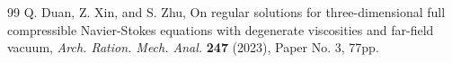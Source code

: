 \documentclass[10pt,a4paper]{amsart}
\begin{document}
\begin{thebibliography}{99}
 Q. Duan, Z. Xin, and S. Zhu, On regular solutions for three-dimensional full compressible Navier-Stokes equations with degenerate viscosities and far-field vacuum, \textit{Arch. Ration. Mech. Anal.} \textbf{247} (2023), Paper No. 3, 77pp.
\end{thebibliography}
\end{document}

